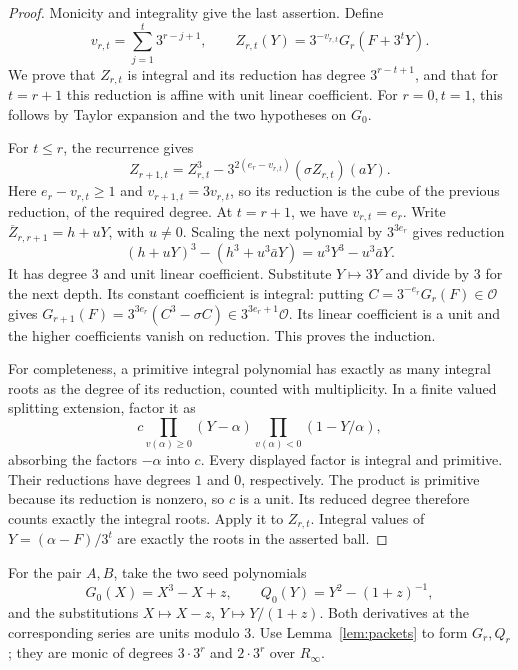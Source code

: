 \begin{proof}
Monicity and integrality give the last assertion. Define
\[
 v_{r,t}=\sum_{j=1}^t3^{r-j+1},\qquad
 Z_{r,t}(Y)=3^{-v_{r,t}}G_r(F+3^tY).
\]
We prove that $Z_{r,t}$ is integral and its reduction has degree
$3^{r-t+1}$, and that for $t=r+1$ this reduction is affine with
unit linear coefficient. For $r=0,t=1$, this follows by Taylor
expansion and the two hypotheses on $G_0$.

For $t\le r$, the recurrence gives
\[
 Z_{r+1,t}=Z_{r,t}^3-
       3^{2(e_r-v_{r,t})}(\sigma Z_{r,t})(aY).
\]
Here $e_r-v_{r,t}\ge1$ and $v_{r+1,t}=3v_{r,t}$, so its reduction
is the cube of the previous reduction, of the required degree.
At $t=r+1$, we have $v_{r,t}=e_r$. Write
$\overline Z_{r,r+1}=h+uY$, with $u\ne0$. Scaling the next polynomial
by $3^{3e_r}$ gives reduction
\[
 (h+uY)^3-(h^3+u^3\bar aY)
       =u^3Y^3-u^3\bar aY.
\]
It has degree $3$ and unit linear coefficient. Substitute $Y\mapsto3Y$
and divide by $3$ for the next depth. Its constant coefficient is
integral: putting $C=3^{-e_r}G_r(F)\in\mathcal O$ gives
$G_{r+1}(F)=3^{3e_r}(C^3-\sigma C)\in3^{3e_r+1}\mathcal O$.
Its linear coefficient is a unit and
the higher coefficients vanish on reduction. This proves the induction.

For completeness, a primitive integral polynomial has exactly as many
integral roots as the degree of its reduction, counted with multiplicity.
In a finite valued splitting extension, factor it as
\[
 c\prod_{v(\alpha)\ge0}(Y-\alpha)
  \prod_{v(\alpha)<0}(1-Y/\alpha),
\]
absorbing the factors $-\alpha$ into $c$. Every displayed factor is
integral and primitive. Their reductions have degrees $1$ and $0$,
respectively. The product is primitive because its reduction is
nonzero, so $c$ is a unit. Its reduced degree therefore counts exactly
the integral roots.
Apply it to $Z_{r,t}$. Integral values of
$Y=(\alpha-F)/3^t$ are exactly the roots in the asserted ball.
\end{proof}

For the pair $A,B$, take the two seed polynomials
\[
 G_0(X)=X^3-X+z,\qquad Q_0(Y)=Y^2-(1+z)^{-1},
\]
and the substitutions $X\mapsto X-z$, $Y\mapsto Y/(1+z)$.
Both derivatives at the corresponding series are units modulo $3$.
Use Lemma~\ref{lem:packets} to form $G_r,Q_r$; they are monic of
degrees $3\cdot3^r$ and $2\cdot3^r$ over $R_\infty$.


